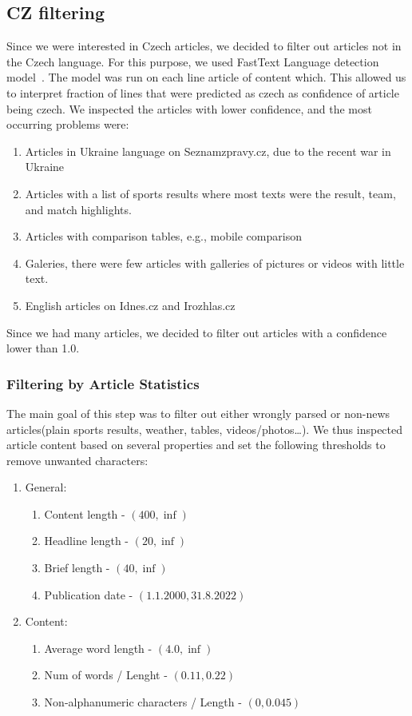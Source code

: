 \subsection{CZ filtering}
Since we were interested in Czech articles, we decided to filter out articles
not in the Czech language. For this purpose,
we used FastText Language detection model~\cite{joulinFastTextZipCompressing2016,joulinBagTricksEfficient2016}. The model was run on each line article of content which. This allowed us to interpret fraction of lines that were predicted as czech as confidence of article being czech.
We inspected the articles with lower confidence, and the most occurring problems were:
\begin{enumerate}
    \item Articles in Ukraine language on Seznamzpravy.cz, due to the recent war in Ukraine
    \item Articles with a list of sports results where most texts were
          the result, team, and match highlights.
    \item Articles with comparison tables, e.g., mobile comparison
    \item Galeries, there were few articles with galleries of pictures or videos with little text.
    \item English articles on Idnes.cz and Irozhlas.cz
\end{enumerate}
Since we had many articles, we decided to filter out articles with a confidence lower than 1.0.

\subsubsection{Filtering by Article Statistics}
\label{sec:filtering-by-article-statistics}
The main goal of this step was to filter out either wrongly parsed
or non-news articles(plain sports results, weather, tables, videos/photos\dots).
We thus inspected article content based on several properties
and set the following thresholds to remove unwanted characters:
\begin{enumerate}
    \item General:
          \begin{enumerate}
              \item Content length - $(400, \inf)$
              \item Headline length - $(20, \inf)$
              \item Brief length - $(40, \inf)$
              \item Publication date - $(1.1.2000, 31.8.2022)$
          \end{enumerate}
    \item Content:
          \begin{enumerate}
              \item Average word length - $(4.0, \inf)$
              \item Num of words / Lenght - $(0.11, 0.22)$
              \item Non-alphanumeric characters / Length - $(0, 0.045)$
          \end{enumerate}
\end{enumerate}

